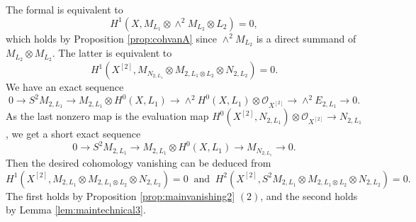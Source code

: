 \documentclass{amsart}
\theoremstyle{plain}
\theoremstyle{definition}
\theoremstyle{remark}
\begin{document}
The formal is equivalent to 
$$
H^1(X, M_{L_1} \otimes \wedge^2 M_{L_2} \otimes L_2)=0, 
$$
which holds by Proposition \ref{prop:cohvanA} since $\wedge^2 M_{L_2}$ is a direct summand of $M_{L_2} \otimes M_{L_2}$. 
The latter is equivalent to
$$
H^1(X^{[2]}, M_{N_{2, L_1}} \otimes M_{2, L_1 \otimes L_2} \otimes N_{2, L_2})=0.
$$
We have an exact sequence
$$
0 \longrightarrow S^2 M_{2, L_1} \longrightarrow M_{2, L_1} \otimes H^0(X, L_1) \longrightarrow \wedge^2 H^0(X, L_1) \otimes \mathcal{O}_{X^{[2]}} \longrightarrow \wedge^2 E_{2,L_1} \longrightarrow 0. 
$$
As the last nonzero map is the evaluation map $H^0(X^{[2]}, N_{2, L_1}) \otimes \mathcal{O}_{X^{[2]}} \to N_{2, L_1}$, we get a short exact sequence
$$
0 \longrightarrow S^2 M_{2, L_1} \longrightarrow M_{2, L_1} \otimes H^0(X, L_1) \longrightarrow M_{N_{2, L_1}} \longrightarrow 0. 
$$
Then the desired cohomology vanishing can be deduced from
$$
H^1(X^{[2]}, M_{2, L_1} \otimes M_{2, L_1 \otimes L_2} \otimes N_{2, L_2}) = 0~\text{ and }~ H^2(X^{[2]}, S^2 M_{2, L_1} \otimes M_{2, L_1 \otimes L_2} \otimes N_{2, L_2}) = 0.
$$
The first holds by Proposition \ref{prop:mainvanishing2} $(2)$, and the second holds by Lemma \ref{lem:maintechnical3}. 
\end{document}
